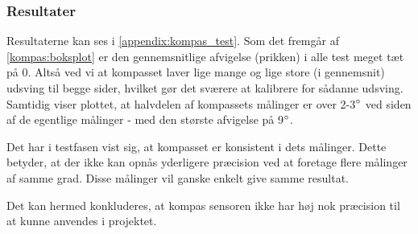 \subsubsection{Resultater}
Resultaterne kan ses i \cref{appendix:kompas_test}. Som det fremgår af \cref{kompas:boksplot} er den gennemsnitlige afvigelse (prikken) i alle test meget tæt på 0.
Altså ved vi at kompasset laver lige mange og lige store (i gennemsnit) udsving til begge sider, hvilket gør det sværere at kalibrere for sådanne udsving.
Samtidig viser plottet, at halvdelen af kompassets målinger er over 2-3$^\circ$ ved siden af de egentlige målinger - med den største afvigelse på 9$^\circ$.

Det har i testfasen vist sig, at kompasset er konsistent i dets målinger.
Dette betyder, at der ikke kan opnås yderligere præcision ved at foretage flere målinger af samme grad.
Disse målinger vil ganske enkelt give samme resultat.

Det kan hermed konkluderes, at kompas sensoren ikke har høj nok præcision til at kunne anvendes i projektet.

